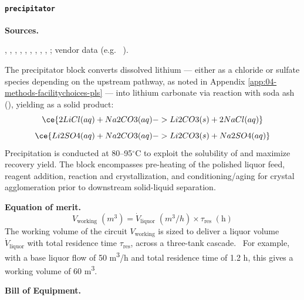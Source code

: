 \documentclass{article}
\renewcommand\_{\textunderscore\allowbreak}
\begin{document}
\clearpage
\paragraph{\texttt{precipitator}}\label{app:04-methods-blockdefs-precipitator}\leavevmode\par

\noindent\textbf{Sources.}\quad

\citet{battagliaRecoveryLithiumCarbonate2022}, \citet{liuProcessAnalysisStudy2021}, \citet{khakmardanLifeCycleAssessment2024}, \citet{iyerLifecycleAnalysisLithium2024}, \citet{royLithiumClayAssessing2024}, \citet{sgscanadaincSK1300Technical2024}, \citet{samariMineralResourceEstimate2024}, \citet{srkconsultingSECTechnicalReport2023a}, \citet{ausimmMonograph27Cost}, \citet{petersPlantDesignEconomics1991}; vendor data (e.g. ~\citet{baguleyMixtechAustraliaFluid2009}).

The precipitator block converts dissolved lithium --- either as a chloride or sulfate species depending on the upstream pathway, as noted in Appendix \ref{app:04-methods-facilitychoices-pls} --- into lithium carbonate via reaction with soda ash (), yielding  as a solid product:
\begin{equation}
    \ce{2LiCl(aq) + Na2CO3(aq) -> Li2CO3(s) + 2NaCl(aq)}
\end{equation}
\begin{equation}
    \ce{Li2SO4(aq) + Na2CO3(aq) -> Li2CO3(s) + Na2SO4(aq)}
\end{equation}
Precipitation is conducted at 80--95$^\circ$C to exploit the solubility of  and maximize recovery yield. The block encompasses pre-heating of the polished liquor feed, reagent addition, reaction and crystallization, and conditioning/aging for crystal agglomeration prior to downstream solid-liquid separation.

\medskip
\noindent\textbf{Equation of merit.}\quad
\[
    V_\text{working}\;(\si{m^3}) = \dot{V}_\text{liquor}\;(\si{m^3/h}) \times \tau_\text{res}\;(\text{h})
\]
The working volume of the circuit $V_\text{working}$ is sized to deliver a liquor volume $\dot{V}_\text{liquor}$ with total residence time $\tau_\text{res}$, across a three-tank cascade.~\cite{srkconsultingSECTechnicalReport2023a} For example, with a base liquor flow of 50 \si{m^3/h} and total residence time of 1.2 h, this gives a working volume of 60 \si{m^3}. 

\medskip
\noindent\textbf{Bill of Equipment.}\quad
 
\end{document}
